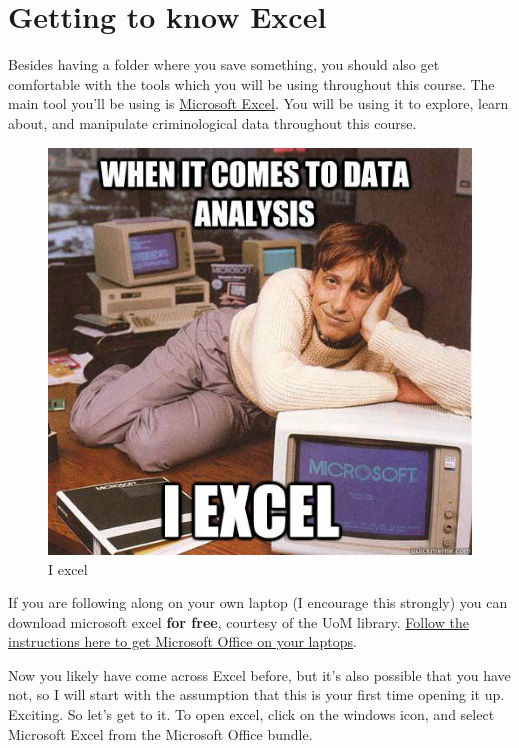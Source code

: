\documentclass[]{book}
\theoremstyle{definition}
\theoremstyle{definition}
\theoremstyle{definition}
\theoremstyle{remark}
\begin{document}
\hypertarget{getting-to-know-excel}{%
\section{Getting to know Excel}\label{getting-to-know-excel}}

Besides having a folder where you save something, you should also get
comfortable with the tools which you will be using throughout this
course. The main tool you'll be using is
\href{https://en.wikipedia.org/wiki/Microsoft_Excel}{Microsoft Excel}.
You will be using it to explore, learn about, and manipulate
criminological data throughout this course.

\begin{figure}
\centering
\includegraphics{imgs/bill_gates_excel.jpg}
\caption{I excel}
\end{figure}

If you are following along on your own laptop (I encourage this
strongly) you can download microsoft excel \textbf{for free}, courtesy
of the UoM library.
\href{http://www.itservices.manchester.ac.uk/students/office365/}{Follow
the instructions here to get Microsoft Office on your laptops}.

Now you likely have come across Excel before, but it's also possible
that you have not, so I will start with the assumption that this is your
first time opening it up. Exciting. So let's get to it. To open excel,
click on the windows icon, and select Microsoft Excel from the Microsoft
Office bundle.
\end{document}
